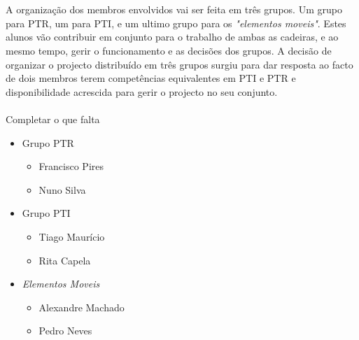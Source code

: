 \documentclass[12pt, a4paper, twoside]{report} %
\begin{document}

\clearpage


\\
\\
A organização dos membros envolvidos vai ser feita em três grupos.
Um grupo para PTR, um para PTI, e um ultimo grupo para os \textit {"elementos moveis"}. 
Estes alunos vão contribuir em conjunto para o trabalho de ambas as cadeiras, e ao mesmo tempo, gerir o funcionamento e as decisões dos grupos.
A decisão de organizar o projecto distribuído em três grupos surgiu para dar resposta ao facto de dois membros terem competências equivalentes em PTI e PTR e disponibilidade acrescida para gerir o projecto no seu conjunto.
\\
\\
Completar o que falta

\begin{itemize}
\item Grupo PTR
\begin{itemize}
	\item Francisco Pires
	\item Nuno Silva
\end{itemize}
\item Grupo PTI
\begin{itemize}
	\item Tiago Maurício
	\item Rita Capela
\end{itemize}
\item \textit{Elementos Moveis}
\begin{itemize}
	\item Alexandre Machado
	\item Pedro Neves
\end{itemize}
\end{itemize}
\end{document}
